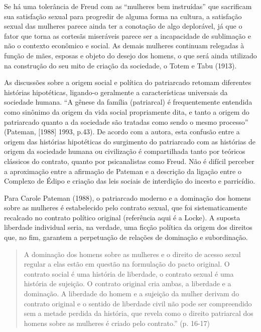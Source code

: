 Se há uma tolerância de Freud com as ``mulheres bem instruídas'' que
sacrificam sua satisfação sexual para progredir de alguma forma na
cultura, a satisfação sexual das mulheres parece ainda ter a conotação
de algo deplorável, já que o fator que torna as cortesãs miseráveis
parece ser a incapacidade de sublimação e não o contexto econômico e
social. As demais mulheres continuam relegadas à função de mães, esposas
e objeto do desejo dos homens, o que será ainda utilizado na construção
do seu mito de criação da sociedade, o Totem e Tabu (1913).

As discussões sobre a origem social e política do patriarcado retomam
diferentes histórias hipotéticas, ligando-o geralmente a características
universais da sociedade humana. ``A gênese da família (patriarcal) é
frequentemente entendida como sinônimo da origem da vida social
propriamente dita, e tanto a origem do patriarcado quanto a da sociedade
são tratadas como sendo o mesmo processo'' (Pateman, {[}1988{]} 1993,
p.43). De acordo com a autora, esta confusão entre a origem das
histórias hipotéticas do surgimento do patriarcado com as histórias de
origem da sociedade humana ou civilização é compartilhada tanto por
teóricos clássicos do contrato, quanto por psicanalistas como Freud. Não
é difícil perceber a aproximação entre a afirmação de Pateman e a
descrição da ligação entre o Complexo de Édipo e criação das leis
sociais de interdição do incesto e parricídio.

Para Carole Pateman (1988), o patriarcado moderno e a dominação dos
homens sobre as mulheres é estabelecido pelo contrato sexual, que foi
sistematicamente recalcado no contrato político original (referência
aqui é a Locke). A suposta liberdade individual seria, na verdade, uma
ficção política da origem dos direitos que, no fim, garantem a
perpetuação de relações de dominação e subordinação.

\begin{quote}
A dominação dos homens sobre as mulheres e o direito de acesso sexul
regular a elas estão em questão na formulação do pacto original. O
contrato social é uma história de liberdade, o contrato sexual é uma
história de sujeição. O contrato original cria ambas, a liberdade e a
dominação. A liberdade do homem e a sujeição da mulher derivam do
contrato original e o sentido de liberdade civil não pode ser
compreendido sem a metade perdida da história, que revela como o direito
patriarcal dos homens sobre as mulheres é criado pelo contrato.'' (p.
16-17)
\end{quote}

